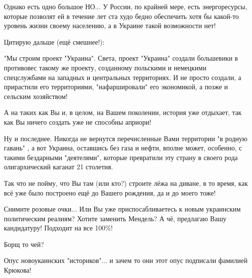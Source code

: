 \begin{itemize}
Однако есть одно большое НО... У России, по крайней мере, есть энергоресурсы,
которые позволят ей в течение лет ста худо бедно обеспечить хотя бы какой-то
уровень жизни своему населению, а в Украине такой возможности нет! 

Цитирую дальше (ещё смешнее!):

"Мы строим проект "Украина". Света, проект "Украина" создали большевики в
противовес такому же проекту, созданному польскими и немецкими спецслужбами на
западных и центральных территориях. И не просто создали, а прирастили его
территориями, "нафаршировали" его экономикой, а позже и сельским хозяйством! 

А на таких как Вы и, в целом, на Вашем поколении, история уже отдыхает, так как
Вы ничего создать уже не способны априори! 

Ну и последнее. Никогда не вернутся перечисленные Вами территории "в родную
гавань" , а вот Украина, оставшись без газа и нефти, вполне может, особенно, с
такими бездарными "деятелями", которые превратили эту страну в своего рода
олигархический каганат 21 столетия. 

Так что не пойму, что Вы там (или кто?) строите лёжа на диване, в то время, как
всё уже было построено ещё до Вашего рождения, да и до моего тоже! 

Снимите розовые очки... Или Вы уже приспосабливаетесь к новым украинским
политическим реалиям?  Хотите заменить Мендель? А чё, предлагаю Вашу
кандидатуру! Подходит на все 100\%!

 
Борщ то чей? \Smiley[1.0][yellow]

 

Опус новоукаинских "историков"... и зачем то они этот опус подписали фамилией
Крюкова!

 

\end{itemize}
